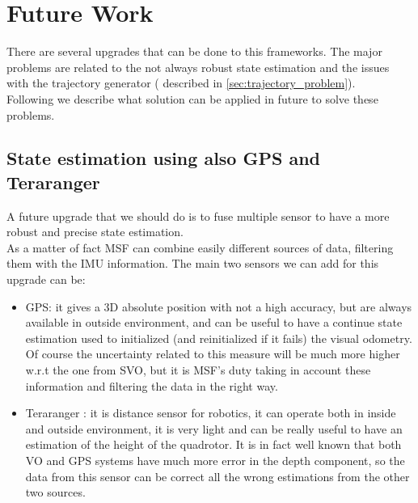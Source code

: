 \section{Future Work}\label{sec:future_work}
There are several upgrades that can be done to this frameworks. The major problems are related to the not always robust state estimation and the issues with the trajectory generator ( described in \ref{sec:trajectory_problem}).\\
 Following we describe what solution can be applied in future to solve these problems.

\subsection{State estimation using also GPS and Teraranger}
A future upgrade that we should do is to fuse multiple sensor to have a more robust and precise state estimation.\\
As a matter of fact MSF can combine easily different sources of data, filtering them with the IMU information.
The main two sensors we can add for this upgrade can be:
\begin{itemize}
\item GPS: it gives a 3D absolute position with not a high accuracy, but are always available in outside environment, and can be useful to have a continue state estimation used to initialized (and reinitialized if it fails) the visual odometry. Of course the uncertainty related to this measure will be much more higher w.r.t the one from SVO, but it is MSF's duty taking in account these information and filtering the data in the right way.
\item Teraranger \cite{teraranger}: it is distance sensor for robotics, it can operate both in inside and outside environment, it is very light and can be really useful to have an estimation of the height of the quadrotor. It is in fact well known that both VO and GPS systems have much more error in the depth component, so the data from this sensor can be correct all the wrong estimations from the other two sources. 
\end{itemize}

